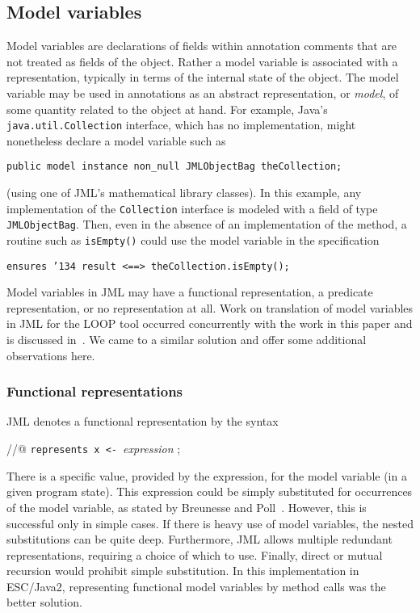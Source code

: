 \documentclass{sig-alternate}
\begin{document}
\subsection{Model variables}

Model variables are declarations of fields within annotation comments that are not treated
as fields of the object.  Rather a model variable is associated with a representation, typically in 
terms of the internal state of the object.  The model variable may be used in annotations
as an abstract representation, or {\em model}, of some quantity related to the object at hand.
For example, Java's \texttt{java.util.Collection} interface, which has no implementation, might 
nonetheless declare a model variable such as
\begin{center} \texttt{public model instance non\_null JMLObjectBag theCollection;} \end{center}
(using one of JML's mathematical library classes).  
In this example, any implementation of the \texttt{Collection} interface is modeled with a field
of type \texttt{JMLObjectBag}.  
Then, even in the absence of an implementation of the method, a routine such as 
\texttt{isEmpty()} could use the model variable in the specification
\begin{center} \texttt{ensures \char'134 result <==> theCollection.isEmpty();} \end{center}

Model variables in JML may have a functional representation, a
predicate representation, or no representation at all.  Work on
translation of model variables in JML for the LOOP tool occurred
concurrently with the work in this paper and is discussed
in~\cite{BreunessePoll03}.  We came to a similar solution and offer
some additional observations here.

\subsubsection {Functional representations}

JML denotes a functional representation by the syntax
\begin{center} //@ \texttt{represents x <- }{\em  expression  } ; \end{center}
There is a specific value, provided by the expression, for the model variable (in a given program 
state).   This expression could be simply substituted for occurrences of the model variable, as
stated by Breunesse and Poll~\cite{BreunessePoll03}.  However, this is successful only in simple cases.  If there
is heavy use of model variables, the nested substitutions can be quite deep.  Furthermore,
JML allows multiple redundant representations, requiring a choice of which to use.  Finally,
direct or mutual recursion would prohibit simple substitution.  In this implementation in
ESC/Java2, representing functional model variables by method
calls was the better
solution.
\end{document}

